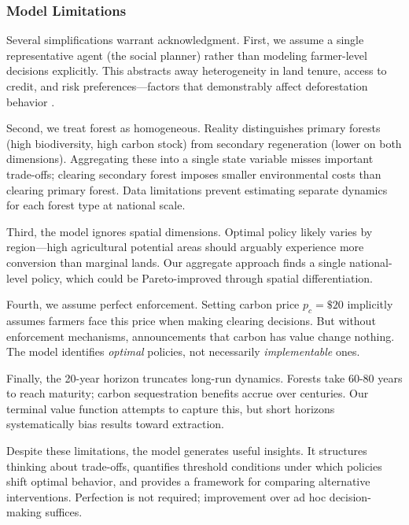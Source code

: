 \subsubsection{Model Limitations}

Several simplifications warrant acknowledgment. First, we assume a single representative agent (the social planner) rather than modeling farmer-level decisions explicitly. This abstracts away heterogeneity in land tenure, access to credit, and risk preferences—factors that demonstrably affect deforestation behavior \citep{angelsen2001agricultural}.

Second, we treat forest as homogeneous. Reality distinguishes primary forests (high biodiversity, high carbon stock) from secondary regeneration (lower on both dimensions). Aggregating these into a single state variable misses important trade-offs; clearing secondary forest imposes smaller environmental costs than clearing primary forest. Data limitations prevent estimating separate dynamics for each forest type at national scale.

Third, the model ignores spatial dimensions. Optimal policy likely varies by region—high agricultural potential areas should arguably experience more conversion than marginal lands. Our aggregate approach finds a single national-level policy, which could be Pareto-improved through spatial differentiation.

Fourth, we assume perfect enforcement. Setting carbon price $p_c = \$20$ implicitly assumes farmers face this price when making clearing decisions. But without enforcement mechanisms, announcements that carbon has value change nothing. The model identifies \textit{optimal} policies, not necessarily \textit{implementable} ones.

Finally, the 20-year horizon truncates long-run dynamics. Forests take 60-80 years to reach maturity; carbon sequestration benefits accrue over centuries. Our terminal value function attempts to capture this, but short horizons systematically bias results toward extraction.

Despite these limitations, the model generates useful insights. It structures thinking about trade-offs, quantifies threshold conditions under which policies shift optimal behavior, and provides a framework for comparing alternative interventions. Perfection is not required; improvement over ad hoc decision-making suffices.
